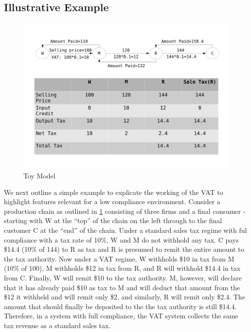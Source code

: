 



\subsection{Illustrative Example}
\label{subsec:background}

\begin{figure}[t!] 
 \includegraphics[width=.9\textwidth]{graphs/example_4.pdf}
\caption{Toy Model}
\label{fig:toy-model}
\end{figure}

We next outline a simple example to explicate the working of the VAT to highlight features relevant for a low compliance environment. Consider a production chain as outlined in \cref{fig:toy-model} consisting of three firms and a final consumer - starting with W at the ``top'' of the chain on the left through to the final customer C at the ``end'' of the chain. Under a standard sales tax regime with ful compliance with a tax rate of 10\%, W and M do not withhold any tax. C pays \$14.4 (10\% of 144) to R as tax and R is presumed to remit the entire amount to the tax authority. Now under a
VAT regime, W withholds \$10 in tax from M (10\% of 100), M withholds \$12 in tax from R, and R will withhold \$14.4 in tax from C. Finally, W will remit \$10 to the tax authority. M, however, will declare that it has already paid \$10 as tax to M and will deduct that amount from the \$12 it withheld and will remit only \$2, and similarly, R will remit only \$2.4. The amount that should finally be deposited to the the tax authority is still \$14.4. Therefore, in a system with full compliance, the VAT system collects the same tax revenue as a standard sales tax.

